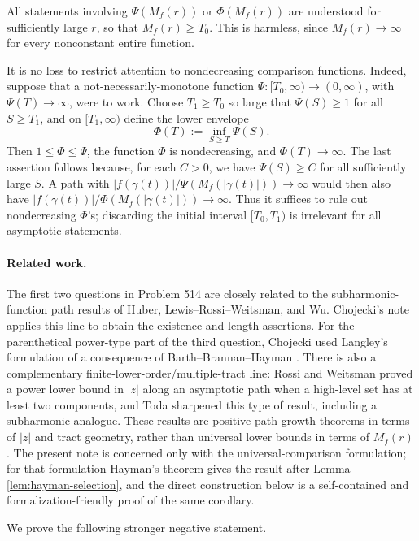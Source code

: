 \documentclass[11pt]{article}
\begin{document}
All statements involving \(\Psi(M_f(r))\) or \(\Phi(M_f(r))\) are understood for
sufficiently large \(r\), so that \(M_f(r)\ge T_0\).  This is harmless, since
\(M_f(r)\to\infty\) for every nonconstant entire function.

It is no loss to restrict attention to nondecreasing comparison functions.
Indeed, suppose that a not-necessarily-monotone function
\(\Psi:[T_0,\infty)\to(0,\infty)\), with \(\Psi(T)\to\infty\), were to work.
Choose \(T_1\ge T_0\) so large that \(\Psi(S)\ge 1\) for all \(S\ge T_1\), and
on \([T_1,\infty)\) define the lower envelope
\[
\Phi(T):=\inf_{S\ge T}\Psi(S).
\]
Then \(1\le\Phi\le\Psi\), the function \(\Phi\) is nondecreasing, and
\(\Phi(T)\to\infty\).  The last assertion follows because, for each \(C>0\),
we have \(\Psi(S)\ge C\) for all sufficiently large \(S\).  A path with
\(|f(\gamma(t))|/\Psi(M_f(|\gamma(t)|))\to\infty\) would then also have
\(|f(\gamma(t))|/\Phi(M_f(|\gamma(t)|))\to\infty\).
Thus it suffices to rule out nondecreasing \(\Phi\)'s; discarding the initial
interval \([T_0,T_1)\) is irrelevant for all asymptotic statements.

\paragraph{Related work.}
The first two questions in Problem 514 are closely related to the
subharmonic-function path results of Huber, Lewis--Rossi--Weitsman, and Wu.
Chojecki's note \cite{Chojecki2026} applies this line to obtain the existence
and length assertions.  For the parenthetical power-type part of the third
question, Chojecki used Langley's formulation \cite[Theorem~1.4]{Langley2022}
of a consequence of Barth--Brannan--Hayman \cite{BarthBrannanHayman1978}.
There is also a complementary finite-lower-order/multiple-tract line: Rossi and
Weitsman \cite{RossiWeitsman1985} proved a power lower bound in \(|z|\) along
an asymptotic path when a high-level set has at least two components, and Toda
\cite{Toda1993} sharpened this type of result, including a subharmonic
analogue.  These results are positive path-growth theorems in terms of \(|z|\)
and tract geometry, rather than universal lower bounds in terms of \(M_f(r)\).
The present note is concerned only with the universal-comparison formulation;
for that formulation Hayman's theorem gives the result after Lemma
\ref{lem:hayman-selection}, and the direct construction below is a
self-contained and formalization-friendly proof of the same corollary.

We prove the following stronger negative statement.
\end{document}
